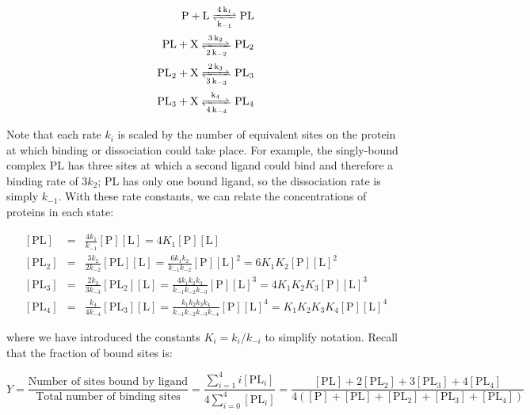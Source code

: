 \documentclass{article}
\begin{document}
\begin{eqnarray*}
\ce{P + L <=>[4k_1][k_{-1}] PL}\\
\ce{PL + X <=>[3k_2][2k_{-2}] PL_2}\\
\ce{PL_2 + X <=>[2k_3][3k_{-3}] PL_3}\\
\ce{PL_3 + X <=>[k_4][4k_{-4}] PL_4}
\end{eqnarray*}

Note that each rate $k_i$ is scaled by the number of equivalent sites on the protein at which binding or dissociation could take place. For example, the singly-bound complex PL has three sites at which a second ligand could bind and therefore a binding rate of $3k_2$; PL has only one bound ligand, so the dissociation rate is simply $k_{-1}$. With these rate constants, we can relate the concentrations of proteins in each state:

\begin{eqnarray*}
\left[ \textrm{PL} \right] & = & \frac{4k_1}{k_{-1}} \left[ \textrm{P} \right]\left[ \textrm{L} \right] = 4K_1 \left[ \textrm{P} \right]\left[ \textrm{L} \right]\\
\left[ \textrm{PL}_2 \right] & = &  \frac{3k_2}{2k_{-2}} \left[ \textrm{PL} \right]\left[ \textrm{L} \right] = \frac{6k_1k_2}{k_{-1}k_{-2}} \left[ \textrm{P} \right]\left[ \textrm{L} \right]^2 = 6K_1K_2 \left[ \textrm{P} \right]\left[ \textrm{L} \right]^2\\
\left[ \textrm{PL}_3 \right] & = &  \frac{2k_3}{3k_{-3}} \left[ \textrm{PL}_2 \right]\left[ \textrm{L} \right] = \frac{4k_1k_2k_3}{k_{-1}k_{-2}k_{-3}} \left[ \textrm{P} \right]\left[ \textrm{L} \right]^3 = 4K_1K_2K_3 \left[ \textrm{P} \right]\left[ \textrm{L} \right]^3\\
\left[ \textrm{PL}_4 \right] & = &  \frac{k_4}{4k_{-4}} \left[ \textrm{PL}_3 \right]\left[ \textrm{L} \right] = \frac{k_1k_2k_3k_4}{k_{-1}k_{-2}k_{-3}k_{-4}} \left[ \textrm{P} \right]\left[ \textrm{L} \right]^4 = K_1K_2K_3K_4 \left[ \textrm{P} \right]\left[ \textrm{L} \right]^4
\end{eqnarray*}

where we have introduced the constants $K_i = k_i/k_{-i}$ to simplify notation. Recall that the fraction of bound sites is:

\[ Y = \frac{\textrm{Number of sites bound by ligand}}{\textrm{Total number of binding sites}} = \frac{\sum_{i=1}^4 i \left[ \textrm{PL}_i \right]}{4 \sum_{i=0}^4 \left[ \textrm{PL}_i \right]} = \frac{\left[ \textrm{PL} \right] + 2 \left[ \textrm{PL}_2 \right] + 3 \left[ \textrm{PL}_3 \right] + 4 \left[ \textrm{PL}_4 \right]}{4 \left( \left[ \textrm{P} \right] + \left[ \textrm{PL} \right] + \left[ \textrm{PL}_2 \right] + \left[ \textrm{PL}_3 \right] + \left[ \textrm{PL}_4 \right] \right)}\]
\end{document}
